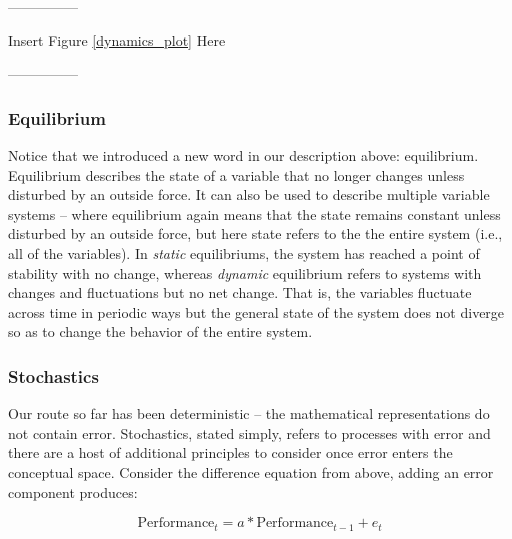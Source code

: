 \documentclass[english,,man]{apa6}
\theoremstyle{definition}
\theoremstyle{definition}
\theoremstyle{definition}
\theoremstyle{remark}
\begin{document}
\begin{center}

---------------

Insert Figure \ref{dynamics_plot} Here

---------------

\end{center}

\hypertarget{equilibrium}{%
\subsubsection{Equilibrium}\label{equilibrium}}

Notice that we introduced a new word in our description above:
equilibrium. Equilibrium describes the state of a variable that no
longer changes unless disturbed by an outside force. It can also be used
to describe multiple variable systems -- where equilibrium again means
that the state remains constant unless disturbed by an outside force,
but here state refers to the the entire system (i.e., all of the
variables). In \emph{static} equilibriums, the system has reached a
point of stability with no change, whereas \emph{dynamic} equilibrium
refers to systems with changes and fluctuations but no net change. That
is, the variables fluctuate across time in periodic ways but the general
state of the system does not diverge so as to change the behavior of the
entire system.

\hypertarget{stochastics}{%
\subsubsection{Stochastics}\label{stochastics}}

Our route so far has been deterministic -- the mathematical
representations do not contain error. Stochastics, stated simply, refers
to processes with error and there are a host of additional principles to
consider once error enters the conceptual space. Consider the difference
equation from above, adding an error component produces:

\begin{equation}
\label{diffE}
\textrm{Performance}_{t} = a * \textrm{Performance}_{t-1} + e_{t}
\end{equation}
\end{document}
